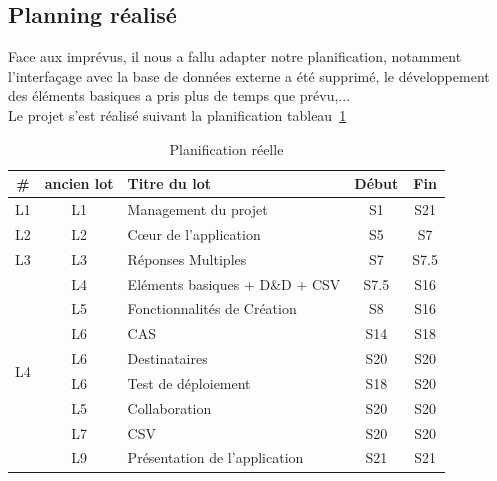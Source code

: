 \documentclass{sigplanconf}
\begin{document}
\subsection{Planning réalisé}
Face aux imprévus, il nous a fallu adapter notre planification, notamment l'interfaçage avec la base de données externe a été supprimé, le développement des éléments basiques a pris plus de temps que prévu,...\\
Le projet s'est réalisé suivant la planification tableau~\ref{planifPost}
\begin{table}
\begin{center}
\begin{tabular}{|c|c|p{4.5cm}|c|c|}
\hline
 \# & ancien lot & Titre du lot & Début & Fin \\ \hline
L1 & L1 & Management du projet & S1 & S21\tabularnewline
L2 & L2 & Cœur de l'application & S5 & S7\tabularnewline
L3 & L3 & Réponses Multiples & S7 & S7.5\tabularnewline
\multirow{8}{*}{L4}
& L4 & Eléments basiques + D\&D + CSV & S7.5 & S16\\
& L5 & Fonctionnalités de Création & S8 & S16\\
& L6 & CAS & S14 & S18\\
& L6 & Destinataires & S20 & S20\\
& L6 & Test de déploiement & S18 & S20\\
& L5 & Collaboration & S20 & S20\\
& L7 & CSV & S20 & S20\\
& L9 & Présentation de l'application & S21 & S21\\
\hline
\end{tabular}
\end{center}
\caption{Planification réelle}\label{planifPost}
\end{table}
\end{document}
